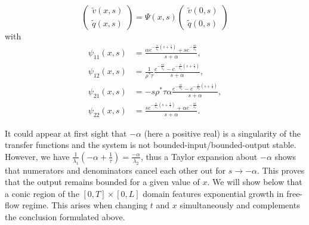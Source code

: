 \documentclass[a4paper, 10pt, conference]{ieeeconf}      %
\begin{document}
\begin{equation} \label{vqfreeflow}
\begin{pmatrix}
	\widetilde{v}(x,s) \\ 
	\widetilde{q}(x,s)
\end{pmatrix} = 
\Psi(x,s)
\begin{pmatrix}
	\widetilde{v}(0,s) \\ 
	\widetilde{q}(0,s)
\end{pmatrix}
\end{equation}
with
\begin{subequations}
\begin{align}
\psi_{11}(x,s) &= 
\frac{
	\alpha e^{-\frac{x}{\lambda_{1}}\left(s+\frac{1}{\tau}\right)}
		+ s e^{-\frac{sx}{\lambda_{2}}}
}{
	s + \alpha
}, \\
\psi_{12}(x,s) &=
\frac{1}{\rho^* \tau}
\frac{
	e^{-\frac{sx}{\lambda_{2}}}
	-
	e^{-\frac{x}{\lambda_{1}}\left(s+\frac{1}		{\tau}\right)}
}{
	s + \alpha
}, \\
\psi_{21}(x,s) &=
- s \rho^{*} \tau \alpha
\frac{
	e^{-\frac{sx}{\lambda_{2}}}
	-
	e^{-\frac{x}{\lambda_{1}}\left(s+\frac{1}		{\tau}\right)}
}{
	s + \alpha
}, \\
\psi_{22}(x,s) &=
\frac{
	s e^{-\frac{x}{\lambda_{1}}\left(s+\frac{1}{\tau}\right)}
		+ \alpha e^{-\frac{sx}{\lambda_{2}}}
}{
	s + \alpha
}.
\end{align}
\end{subequations}

It could appear at first sight that $-\alpha$ (here a positive real) is a singularity of the transfer functions and the system is not bounded-input/bounded-output stable. However, we have $\frac{1}{\lambda_{1}}\left(-\alpha+\frac{1}{\tau}\right) = \frac{-\alpha}{\lambda_{2}}$, thus a Taylor expansion about $-\alpha$ shows that numerators and denominators cancel each other out for $s \rightarrow -\alpha$. This proves that the output remains bounded for a given value of $x$. We will show below that a conic region of the $\left[0,T\right] \times \left[0,L\right]$ domain features exponential growth in free-flow regime. This arises when changing $t$ and $x$ simultaneously and complements the conclusion formulated above.
\end{document}
